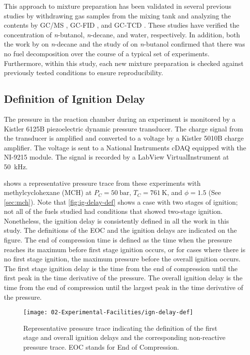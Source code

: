 \documentclass[12pt, letterpaper]{article}
\begin{document}
This approach to mixture preparation has been validated in several previous
studies by withdrawing gas samples from the mixing tank and analyzing the
contents by GC/MS \cite{Weber2011}, GC-FID \cite{Kumar2009}, and GC-TCD
\cite{Das2012}. These studies have verified the concentration of
\textit{n}-butanol, \textit{n}-decane, and water, respectively. In addition,
both the work by \textcite{Kumar2009} on \textit{n}-decane and the study of
\textcite{Weber2011} on \textit{n}-butanol confirmed that there was no fuel
decomposition over the course of a typical set of experiments. Furthermore,
within this study, each new mixture preparation is checked against previously
tested conditions to ensure reproducibility.

\subsection{Definition of Ignition Delay}
\label{sec:ig-delay-def}

The pressure in the reaction chamber during an experiment is monitored by a
Kistler 6125B piezoelectric dynamic pressure transducer. The charge signal from the
transducer is amplified and converted to a voltage by a Kistler 5010B charge amplifier.
The voltage is sent to a National Instruments cDAQ equipped with the NI-9215 module.
The signal is recorded by a LabView VirtualInstrument at \SI{50}{\kilo\hertz}.

 shows a representative pressure trace from
these experiments with methylcyclohexane (MCH) at $P_C= \SI{50}{\bar}$, $T_C=\SI{761}{\kelvin}$,
and $\phi=\num{1.5}$ (See \autoref{sec:mch}). Note that \autoref{fig:ig-delay-def}
shows a case with two stages of ignition; not all of the fuels studied
had conditions that showed two-stage ignition. Nonetheless, the ignition
delay is consistently defined in all the work in this study. The
definitions of the EOC and the ignition delays are indicated on the figure.
The end of compression time is defined as the time when the pressure
reaches its maximum before first stage ignition occurs, or for cases
where there is no first stage ignition, the maximum pressure before
the overall ignition occurs. The first stage ignition delay is the time
from the end of compression until the first peak in the time derivative
of the pressure. The overall ignition delay is the time from the end of
compression until the largest peak in the time derivative of the pressure.

\begin{figure}
    \centering
    \texttt{[image: 02-Experimental-Facilities/ign-delay-def]}
    \caption{Representative pressure trace indicating the definition of
    the first stage and overall ignition delays and the corresponding
    non-reactive pressure trace. EOC stands for End of Compression.}
    \label{fig:ig-delay-def}
\end{figure}
\end{document}
